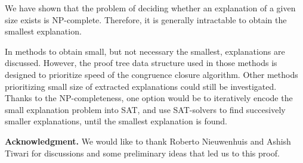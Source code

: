 \documentclass{easychair}
\begin{document}
We have shown that the problem of deciding whether an explanation of a given size exists is NP-complete. Therefore, it is generally intractable to obtain the smallest explanation. 

In \cite{Nieuwenhuis3,Nieuwenhuis9} methods to obtain small, but not necessary the smallest, explanations are discussed.
However, the proof tree data structure used in those methods is designed to prioritize speed of the congruence closure algorithm. 
Other methods prioritizing small size of extracted explanations could still be investigated. Thanks to the NP-completeness, one option would be to iteratively encode the small explanation problem into SAT, and use SAT-solvers to find succesively smaller explanations, until the smallest explanation is found.  

\vspace*{5pt}\noindent
{\bf Acknowledgment.} We would like to thank Roberto Nieuwenhuis and Ashish
Tiwari for discussions and some preliminary ideas that led us to this proof.



\end{document}
